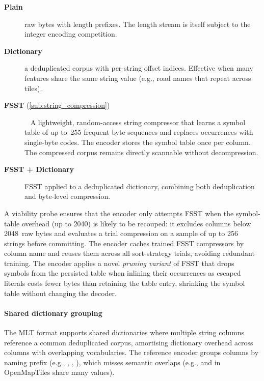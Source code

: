 {\begin{description}
    \item[\textbf{Plain}] raw bytes with length prefixes.
    The length stream is itself subject to the integer encoding competition.
    \item[\textbf{Dictionary}] a deduplicated corpus with per-string offset indices.
    Effective when many features share the same string value (e.g., road names that repeat across tiles).
    \item[\textbf{\ac{FSST}} (\cref{sub:string_compression})]~\cite{bonczFSSTFastRandom2020}
    A lightweight, random-access string compressor that learns a symbol table of up to~255 frequent byte sequences and replaces occurrences with single-byte codes.
    The encoder stores the symbol table once per column.
The compressed corpus remains directly scannable without decompression.
    \item[\textbf{\ac{FSST} + Dictionary}] \ac{FSST} applied to a deduplicated dictionary, combining both deduplication and byte-level compression.
\end{description}

A viability probe ensures that the encoder only attempts \ac{FSST} when the symbol-table overhead (up to \qty{2040}{\byte}) is likely to be recouped: it excludes columns below \num{2048}~raw bytes and evaluates a trial compression on a sample of up to \num{256} strings before committing.
The encoder caches trained \ac{FSST} compressors by column name and reuses them across all sort-strategy trials, avoiding redundant training.
The encoder applies a novel \emph{pruning variant} of \ac{FSST} that drops symbols from the persisted table when inlining their occurrences as escaped literals costs fewer bytes than retaining the table entry, shrinking the symbol table without changing the decoder.

\paragraph{Shared dictionary grouping}\label{sub:cardinality}
The \ac{MLT} format supports shared dictionaries where multiple string columns reference a common deduplicated corpus, amortising dictionary overhead across columns with overlapping vocabularies.
The reference encoder groups columns by naming prefix (e.g., \texttt{}, \texttt{}, \texttt{}), which misses semantic overlaps (e.g., \texttt{} and \texttt{} in OpenMapTiles share many values).

}
